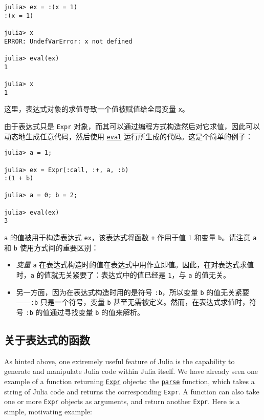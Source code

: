 \begin{verbatim}
julia> ex = :(x = 1)
:(x = 1)

julia> x
ERROR: UndefVarError: x not defined

julia> eval(ex)
1

julia> x
1
\end{verbatim}



这里，表达式对象的求值导致一个值被赋值给全局变量 \texttt{x}。



由于表达式只是 \texttt{Expr} 对象，而其可以通过编程方式构造然后对它求值，因此可以动态地生成任意代码，然后使用 \hyperlink{7507639810592563424}{\texttt{eval}} 运行所生成的代码。这是个简单的例子：




\begin{verbatim}
julia> a = 1;

julia> ex = Expr(:call, :+, a, :b)
:(1 + b)

julia> a = 0; b = 2;

julia> eval(ex)
3
\end{verbatim}



\texttt{a} 的值被用于构造表达式 \texttt{ex}，该表达式将函数 \texttt{+} 作用于值 1 和变量 \texttt{b}。请注意 \texttt{a} 和 \texttt{b} 使用方式间的重要区别：



\begin{itemize}
\item \emph{变量} \texttt{a} 在表达式构造时的值在表达式中用作立即值。因此，在对表达式求值时，\texttt{a} 的值就无关紧要了：表达式中的值已经是 \texttt{1}，与 \texttt{a} 的值无关。


\item 另一方面，因为在表达式构造时用的是符号 \texttt{:b}，所以变量 \texttt{b} 的值无关紧要——\texttt{:b} 只是一个符号，变量 \texttt{b} 甚至无需被定义。然而，在表达式求值时，符号 \texttt{:b} 的值通过寻找变量 \texttt{b} 的值来解析。

\end{itemize}


\hypertarget{2578517908282982662}{}


\subsection{关于表达式的函数}



As hinted above, one extremely useful feature of Julia is the capability to generate and manipulate Julia code within Julia itself. We have already seen one example of a function returning \hyperlink{17120496304147995299}{\texttt{Expr}} objects: the \hyperlink{14207407853646164654}{\texttt{parse}} function, which takes a string of Julia code and returns the corresponding \texttt{Expr}. A function can also take one or more \texttt{Expr} objects as arguments, and return another \texttt{Expr}. Here is a simple, motivating example:




